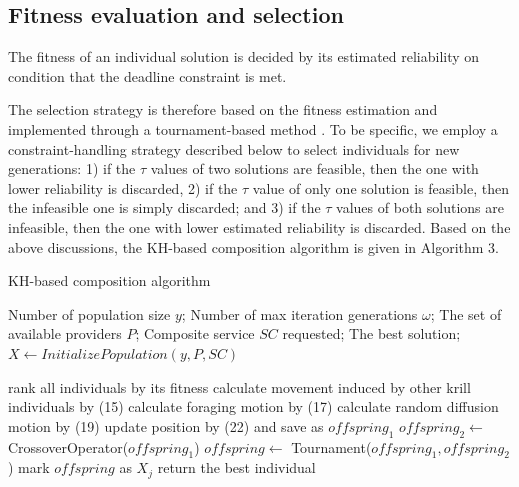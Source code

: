 \documentclass[journal]{IEEEtran}
\begin{document}
\subsection{Fitness evaluation and selection}
The fitness of an individual solution is decided by its estimated reliability on condition that the deadline constraint is met.

The selection strategy is therefore based on the fitness estimation and implemented through a tournament-based method \cite{whitley1994genetic}. To be specific, we employ a constraint-handling strategy described below to select individuals for new generations: 1) if the $\tau$ values of two solutions are feasible, then the one with lower reliability is discarded, 2) if the $\tau$ value of only one solution is feasible, then the infeasible one is simply discarded; and 3) if the $\tau$ values of both solutions are infeasible, then the one with lower estimated reliability is discarded.
Based on the above discussions, the KH-based composition algorithm is given in Algorithm 3.

\begin{algorithm}
\caption{KH-based composition algorithm}
\label{KH}
\begin{algorithmic}[1]

\REQUIRE Number of population size $y$; Number of max iteration generations $\omega$; The set of available providers $P$;  Composite service $SC$ requested;
\ENSURE The best solution;
\STATE $X \leftarrow InitializePopulation(y,P,SC)$

  \STATE rank all individuals by its fitness
    \STATE calculate movement induced by other krill individuals by (15)
    \STATE calculate foraging motion by (17)
    \STATE calculate random diffusion motion by (19)
    \STATE update position by (22) and save as $offspring_1$
    \STATE $offspring_2 \leftarrow $ CrossoverOperator($offspring_1$)
    \STATE $offspring \leftarrow $ Tournament($offspring_1, offspring_2$)
    \STATE mark $offspring$ as $X_j$
  \ENDFOR
\ENDFOR
\STATE return the best individual
\end{algorithmic}
\end{algorithm}
\end{document}
